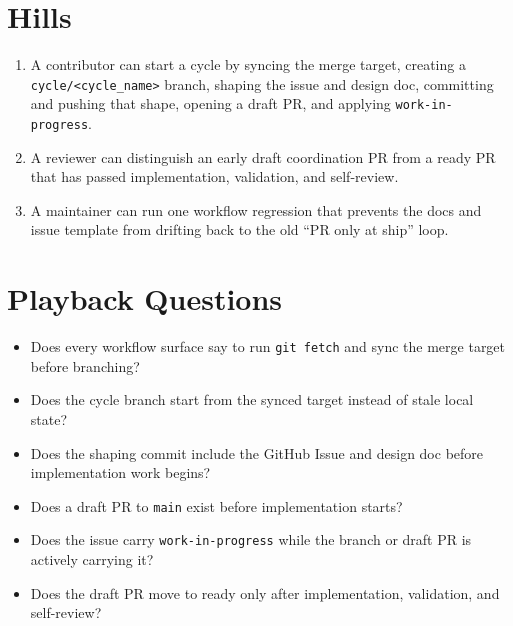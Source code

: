 \section{Hills}\label{record-208-hills}

\begin{enumerate}
\def\labelenumi{\arabic{enumi}.}
\tightlist
\item
  A contributor can start a cycle by syncing the merge target, creating a \texttt{c\allowbreak{}y\allowbreak{}c\allowbreak{}l\allowbreak{}e\allowbreak{}/\allowbreak{}<\allowbreak{}c\allowbreak{}y\allowbreak{}c\allowbreak{}l\allowbreak{}e\allowbreak{}\_\allowbreak{}n\allowbreak{}a\allowbreak{}m\allowbreak{}e\allowbreak{}>} branch, shaping the issue and design doc, committing and pushing that shape, opening a draft PR, and applying \texttt{w\allowbreak{}o\allowbreak{}r\allowbreak{}k\allowbreak{}-\allowbreak{}i\allowbreak{}n\allowbreak{}-\allowbreak{}p\allowbreak{}r\allowbreak{}o\allowbreak{}g\allowbreak{}r\allowbreak{}e\allowbreak{}s\allowbreak{}s}.
\item
  A reviewer can distinguish an early draft coordination PR from a ready PR that has passed implementation, validation, and self-review.
\item
  A maintainer can run one workflow regression that prevents the docs and issue template from drifting back to the old ``PR only at ship'' loop.
\end{enumerate}

\section{Playback Questions}\label{record-208-playback-questions}

\begin{itemize}
\tightlist
\item
  Does every workflow surface say to run \texttt{g\allowbreak{}i\allowbreak{}t\allowbreak{} \allowbreak{}f\allowbreak{}e\allowbreak{}t\allowbreak{}c\allowbreak{}h} and sync the merge target before branching?
\item
  Does the cycle branch start from the synced target instead of stale local state?
\item
  Does the shaping commit include the GitHub Issue and design doc before implementation work begins?
\item
  Does a draft PR to \texttt{m\allowbreak{}a\allowbreak{}i\allowbreak{}n} exist before implementation starts?
\item
  Does the issue carry \texttt{w\allowbreak{}o\allowbreak{}r\allowbreak{}k\allowbreak{}-\allowbreak{}i\allowbreak{}n\allowbreak{}-\allowbreak{}p\allowbreak{}r\allowbreak{}o\allowbreak{}g\allowbreak{}r\allowbreak{}e\allowbreak{}s\allowbreak{}s} while the branch or draft PR is actively carrying it?
\item
  Does the draft PR move to ready only after implementation, validation, and self-review?
\end{itemize}


